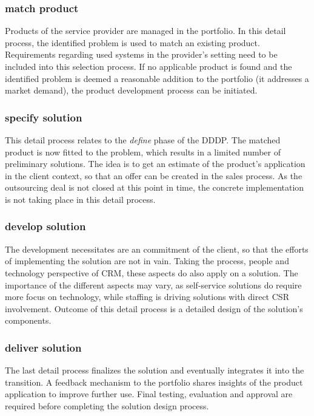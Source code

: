 	\subsubsection{match product}
	Products of the service provider are managed in the portfolio. In this detail process, the identified problem is used to match an existing product. Requirements regarding used systems in the provider's setting need to be included into this selection process. If no applicable product is found and the identified problem is deemed a reasonable addition to the portfolio (\ie it addresses a market demand), the product development process can be initiated. 
	
 	\subsubsection{specify solution}
 	This detail process relates to the \textit{define} phase of the \acrshort{DDDP}. The matched product is now fitted to the problem, which results in a limited number of preliminary solutions. The idea is to get an estimate of the product's application in the client context, so that an offer can be created in the sales process. As the outsourcing deal is not closed at this point in time, the concrete implementation is not taking place in this detail process. 
 	
	\subsubsection{develop solution}
	The development necessitates are an commitment of the client, so that the efforts of implementing the solution are not in vain. Taking the process, people and technology perspective of \acrshort{CRM}, these aspects do also apply on a solution. The importance of the different aspects may vary, as self-service solutions do require more focus on technology, while staffing is driving solutions with direct \acrshort{CSR} involvement. Outcome of this detail process is a detailed design of the solution's components. 
	
 	\subsubsection{deliver solution}
	 
	 The last detail process finalizes the solution and eventually integrates it into the transition. A feedback mechanism to the portfolio shares insights of the product application to improve further use. Final testing, evaluation and approval are required before completing the solution design process.
	
